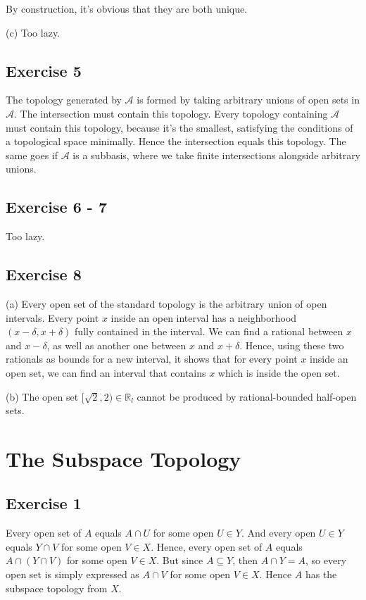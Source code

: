 \documentclass{book}
\begin{document}
By construction, it's obvious that they are both unique.

\noindent
(c)
Too lazy.

\subsection*{Exercise 5}
The topology generated by $\mathcal{A}$ is formed by taking arbitrary unions of open sets in $\mathcal{A}$. The intersection must contain this topology. Every topology containing $\mathcal{A}$ must contain this topology, because it's the smallest, satisfying the conditions of a topological space minimally. Hence the intersection equals this topology. The same goes if $\mathcal{A}$ is a subbasis, where we take finite intersections alongside arbitrary unions.

\subsection*{Exercise 6 - 7}
Too lazy.

\subsection*{Exercise 8}
(a)
Every open set of the standard topology is the arbitrary union of open intervals. Every point $x$ inside an open interval has a neighborhood $(x - \delta, x + \delta)$ fully contained in the interval. We can find a rational between $x$ and $x - \delta$, as well as another one between $x$ and $x + \delta$. Hence, using these two rationals as bounds for a new interval, it shows that for every point $x$ inside an open set, we can find an interval that contains $x$ which is inside the open set.

\noindent
(b)
The open set $[\sqrt{2}, 2) \in \mathbb{R}_l$ cannot be produced by rational-bounded half-open sets.

\section{The Subspace Topology}

\subsection*{Exercise 1}
Every open set of $A$ equals $A \cap U$ for some open $U \in Y$. And every open $U \in Y$ equals $Y \cap V$ for some open $V \in X$. Hence, every open set of $A$ equals $A \cap (Y \cap V)$ for some open $V \in X$. But since $A \subseteq Y$, then $A \cap Y = A$, so every open set is simply expressed as $A \cap V$ for some open $V \in X$. Hence $A$ has the subspace topology from $X$.
\end{document}
